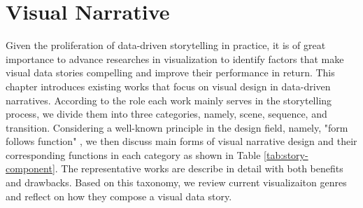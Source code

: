 \chapter{Visual Narrative}\label{sec-design}
Given the proliferation of data-driven storytelling in practice, it is of great importance to advance researches in visualization to identify factors that make visual data stories compelling and improve their performance in return. This chapter introduces existing works that focus on visual design in data-driven narratives. According to the role each work mainly serves in the storytelling process, we divide them into three categories, namely, scene, sequence, and transition. Considering a well-known principle in the design field, namely, "form follows function" \cite{form}, we then discuss main forms of visual narrative design and their corresponding functions in each category as shown in Table \ref{tab:story-component}. The representative works are describe in detail with both benefits and drawbacks. 
Based on this taxonomy, we review current visualizaiton genres and  reflect on how they compose a visual data story.

\renewcommand{\arraystretch}{1.5}

